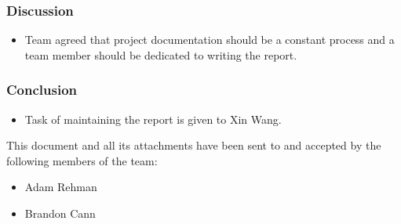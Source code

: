 \documentclass[a4paper]{article}
\begin{document}
\subsubsection{Discussion}
\begin{itemize}
    \item Team agreed that project documentation should be a constant process and a team member should be dedicated to
    writing the report.
\end{itemize}
\subsubsection{Conclusion}
\begin{itemize}
    \item Task of maintaining the report is given to Xin Wang. 
\end{itemize}
\vspace*{\fill}
\begin{center}
This document and all its attachments have been sent to and accepted by the following members of the team:
\begin{itemize}
\item Adam Rehman
\item Brandon Cann
\end{itemize}
\end{center}
\end{document}
